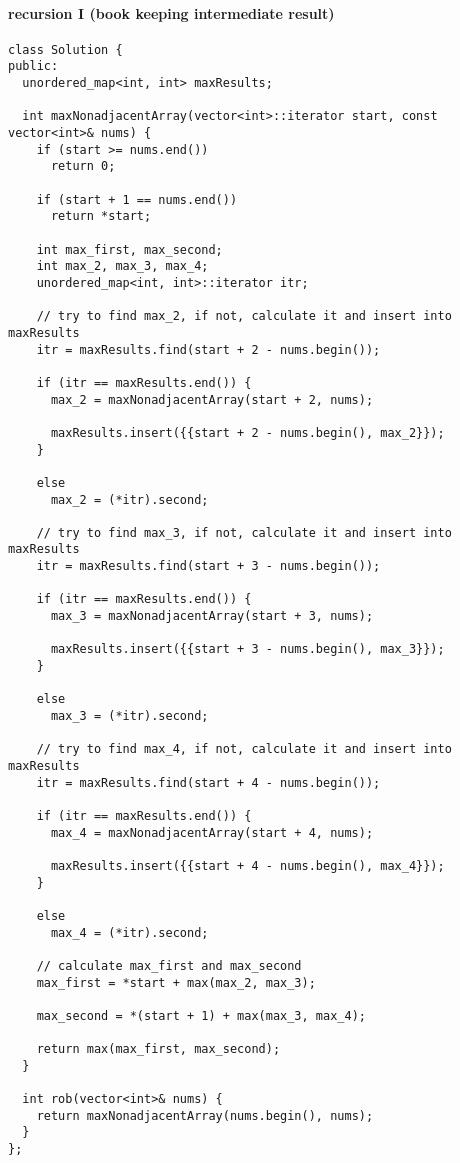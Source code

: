 \documentclass[11pt]{article}
\begin{document}
\paragraph{recursion I (book keeping intermediate result)}
\label{sec:org7ecfa46}
\begin{verbatim}
class Solution {
public:
  unordered_map<int, int> maxResults;

  int maxNonadjacentArray(vector<int>::iterator start, const vector<int>& nums) {
    if (start >= nums.end())
      return 0;

    if (start + 1 == nums.end())
      return *start;

    int max_first, max_second;
    int max_2, max_3, max_4;
    unordered_map<int, int>::iterator itr;

    // try to find max_2, if not, calculate it and insert into maxResults
    itr = maxResults.find(start + 2 - nums.begin());

    if (itr == maxResults.end()) {
      max_2 = maxNonadjacentArray(start + 2, nums);

      maxResults.insert({{start + 2 - nums.begin(), max_2}});
    }

    else
      max_2 = (*itr).second;

    // try to find max_3, if not, calculate it and insert into maxResults
    itr = maxResults.find(start + 3 - nums.begin());

    if (itr == maxResults.end()) {
      max_3 = maxNonadjacentArray(start + 3, nums);

      maxResults.insert({{start + 3 - nums.begin(), max_3}});
    }

    else
      max_3 = (*itr).second;

    // try to find max_4, if not, calculate it and insert into maxResults
    itr = maxResults.find(start + 4 - nums.begin());

    if (itr == maxResults.end()) {
      max_4 = maxNonadjacentArray(start + 4, nums);

      maxResults.insert({{start + 4 - nums.begin(), max_4}});
    }

    else
      max_4 = (*itr).second;

    // calculate max_first and max_second 
    max_first = *start + max(max_2, max_3);

    max_second = *(start + 1) + max(max_3, max_4);

    return max(max_first, max_second);
  }

  int rob(vector<int>& nums) {
    return maxNonadjacentArray(nums.begin(), nums);
  }
};
\end{verbatim}
\end{document}
